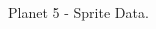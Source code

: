 \begin{figure}[H]
{\begin{adjustbox}{width=\textwidth}
  \end{adjustbox}

  }\caption*{Planet 5 - Sprite Data.}
\end{figure}


